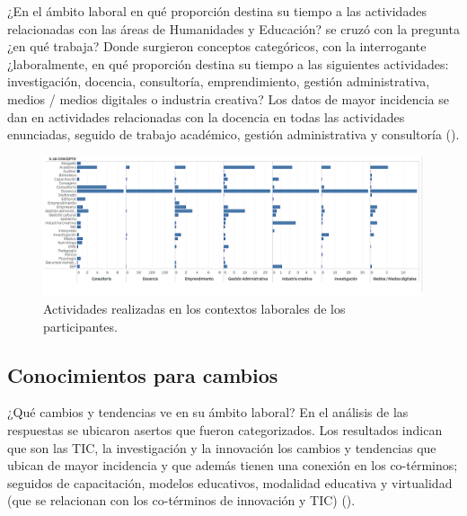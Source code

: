 \documentclass{textolivre}
\begin{document}
¿En el ámbito laboral en qué proporción destina su tiempo a las actividades relacionadas con las áreas de Humanidades y Educación? se cruzó con la pregunta ¿en qué trabaja? Donde surgieron conceptos categóricos, con la interrogante ¿laboralmente, en qué proporción destina su tiempo a las siguientes actividades: investigación, docencia, consultoría, emprendimiento, gestión administrativa, medios / medios digitales o industria creativa? Los datos de mayor incidencia se dan en actividades relacionadas con la docencia en todas las actividades enunciadas, seguido de trabajo académico, gestión administrativa y consultoría ().

\begin{figure}[htbp]
 \hspace*{-1.3in}
 \includegraphics[width=1.22\textwidth]{Fig5.png}
 \caption{Actividades realizadas en los contextos laborales de los participantes.}
 \label{fig5}
\end{figure}

\subsection{Conocimientos para cambios}\label{sec-resumo}
¿Qué cambios y tendencias ve en su ámbito laboral? En el análisis de las respuestas se ubicaron asertos que fueron categorizados. Los resultados indican que son las TIC, la investigación y la innovación los cambios y tendencias que ubican de mayor incidencia y que además tienen una conexión en los co-términos; seguidos de capacitación, modelos educativos, modalidad educativa y virtualidad (que se relacionan con los co-términos de innovación y TIC) ().
\end{document}
